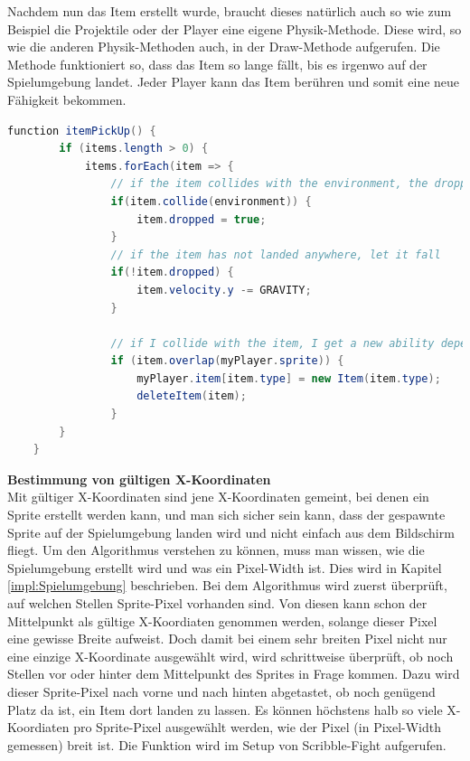 Nachdem nun das Item erstellt wurde, braucht dieses natürlich auch so wie zum Beispiel die Projektile oder der Player eine eigene Physik-Methode. Diese wird, so wie die anderen Physik-Methoden auch, in der Draw-Methode aufgerufen.
Die Methode funktioniert so, dass das Item so lange fällt, bis es irgenwo auf der Spielumgebung landet. Jeder Player kann das Item berühren und somit eine neue Fähigkeit bekommen.

\begin{lstlisting}[caption=Item-Physik,language=Java,label=lst:impl:itemPhy]
    function itemPickUp() {
        if (items.length > 0) {
            items.forEach(item => {
                // if the item collides with the environment, the dropped-attribute becomes true
                if(item.collide(environment)) {
                    item.dropped = true;
                }
                // if the item has not landed anywhere, let it fall 
                if(!item.dropped) {
                    item.velocity.y -= GRAVITY;
                }
    
                // if I collide with the item, I get a new ability depending on the type of the item and the item gets deleted
                if (item.overlap(myPlayer.sprite)) {
                    myPlayer.item[item.type] = new Item(item.type);
                    deleteItem(item);
                }
        }
    }
    \end{lstlisting}

\textbf{Bestimmung von gültigen X-Koordinaten} \label{impl:xCoordinates}
\\
Mit gültiger X-Koordinaten sind jene X-Koordinaten gemeint, bei denen ein Sprite erstellt werden kann, und man sich sicher sein kann, dass der gespawnte Sprite auf der Spielumgebung landen wird und nicht einfach aus dem Bildschirm fliegt.
Um den Algorithmus verstehen zu können, muss man wissen, wie die Spielumgebung erstellt wird und was ein Pixel-Width ist. Dies wird in Kapitel \ref{impl:Spielumgebung} beschrieben.
Bei dem Algorithmus wird zuerst überprüft, auf welchen Stellen Sprite-Pixel vorhanden sind. Von diesen kann schon der Mittelpunkt als gültige X-Koordiaten genommen werden, solange dieser Pixel eine gewisse Breite aufweist. 
Doch damit bei einem sehr breiten Pixel nicht nur eine einzige X-Koordinate ausgewählt wird, wird schrittweise überprüft, ob noch Stellen vor oder hinter dem Mittelpunkt des Sprites in Frage kommen.
Dazu wird dieser Sprite-Pixel nach vorne und nach hinten abgetastet, ob noch genügend Platz da ist, ein Item dort landen zu lassen. 
Es können höchstens halb so viele X-Koordiaten pro Sprite-Pixel ausgewählt werden, wie der Pixel (in Pixel-Width gemessen) breit ist. 
Die Funktion wird im Setup von Scribble-Fight aufgerufen. 

